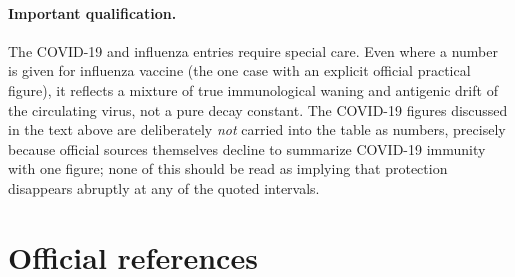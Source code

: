 \documentclass[11pt]{article}
\begin{document}
\paragraph{Important qualification.} The COVID-19 and influenza entries
require special care. Even where a number is given for influenza vaccine
(the one case with an explicit official practical figure), it reflects a
mixture of true immunological waning and antigenic drift of the circulating
virus, not a pure decay constant. The COVID-19 figures discussed in the
text above are deliberately \emph{not} carried into the table as numbers,
precisely because official sources themselves decline to summarize
COVID-19 immunity with one figure; none of this should be read as implying
that protection disappears abruptly at any of the quoted intervals.

\section{Official references}
\end{document}
